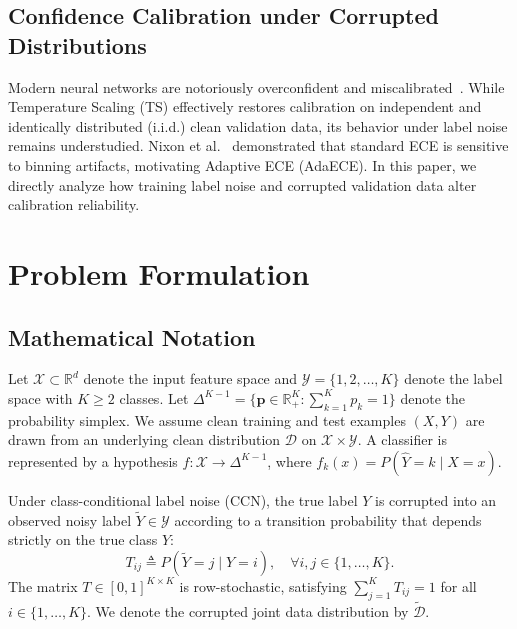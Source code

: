 \documentclass[journal]{IEEEtran}
\theoremstyle{definition}
\begin{document}
\subsection{Confidence Calibration under Corrupted Distributions}
Modern neural networks are notoriously overconfident and miscalibrated~\cite{guo2017calibration}. While Temperature Scaling (TS) effectively restores calibration on independent and identically distributed (i.i.d.) clean validation data, its behavior under label noise remains understudied. Nixon et al.~\cite{nixon2019measuring} demonstrated that standard ECE is sensitive to binning artifacts, motivating Adaptive ECE (AdaECE). In this paper, we directly analyze how training label noise and corrupted validation data alter calibration reliability.

\section{Problem Formulation}

\subsection{Mathematical Notation}
Let $\mathcal{X} \subset \mathbb{R}^d$ denote the input feature space and $\mathcal{Y} = \{1, 2, \dots, K\}$ denote the label space with $K \ge 2$ classes. Let $\Delta^{K-1} = \{\mathbf{p} \in \mathbb{R}_+^K : \sum_{k=1}^K p_k = 1\}$ denote the probability simplex. We assume clean training and test examples $(X, Y)$ are drawn from an underlying clean distribution $\mathcal{D}$ on $\mathcal{X} \times \mathcal{Y}$. A classifier is represented by a hypothesis $f: \mathcal{X} \to \Delta^{K-1}$, where $f_k(x) = P(\hat{Y} = k \mid X = x)$.

Under class-conditional label noise (CCN), the true label $Y$ is corrupted into an observed noisy label $\tilde{Y} \in \mathcal{Y}$ according to a transition probability that depends strictly on the true class $Y$:
\begin{equation}
T_{ij} \triangleq P(\tilde{Y} = j \mid Y = i), \quad \forall i, j \in \{1, \dots, K\}.
\end{equation}
The matrix $T \in [0, 1]^{K \times K}$ is row-stochastic, satisfying $\sum_{j=1}^K T_{ij} = 1$ for all $i \in \{1, \dots, K\}$. We denote the corrupted joint data distribution by $\tilde{\mathcal{D}}$.
\end{document}

